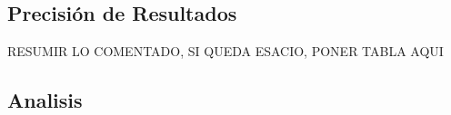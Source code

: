 \documentclass[12pt]{article} %
\begin{document}
\subsection{Precisión de Resultados}

RESUMIR LO COMENTADO, SI QUEDA ESACIO, PONER TABLA AQUI






\subsection{Analisis}
\end{document}
